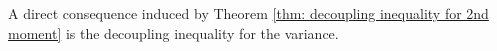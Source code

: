 \documentclass[ECP]{ejpecp} %
\newcommand{\G}{\mathcal{G}}
\newcommand{\lpar}{\left(}
\newcommand{\rpar}{\right)}
\newcommand{\lbr}{\left[}
\newcommand{\rbr}{\right]}
\newcommand{\E}{\mathbb{E}}
\newcommand{\sumn}{\sum\limits_{i=1}^n}
\begin{document}

A direct consequence induced by Theorem \ref{thm: decoupling inequality for 2nd moment} is the decoupling inequality for the variance.
\end{document}
